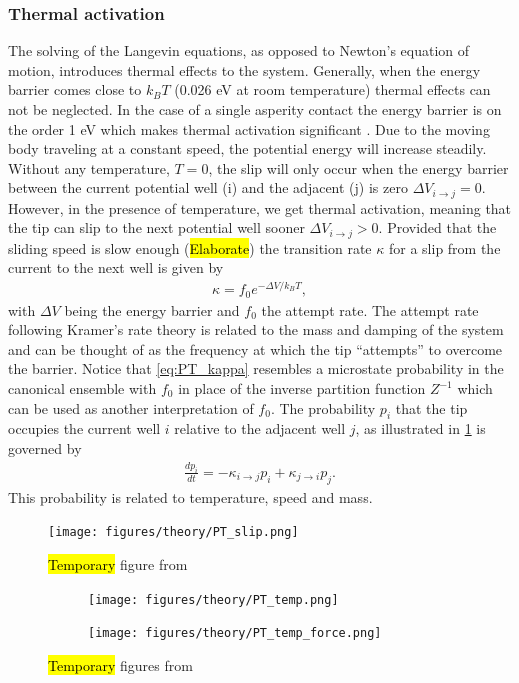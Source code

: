 \subsubsection{Thermal activation}
The solving of the Langevin equations, as opposed to Newton's equation of motion, introduces thermal effects to the system. Generally, when the energy barrier comes close to $k_B T$ (0.026 eV at room temperature) thermal effects can not be neglected. In the case of a single asperity contact the energy barrier is on the order 1 eV which makes thermal activation significant \cite{Yalin_2011}. Due to the moving body traveling at a constant speed, the potential energy will increase steadily. Without any temperature, $T = 0$, the slip will only occur when the energy barrier between the current potential well (i) and the adjacent (j) is zero $\Delta V_{i\to j} = 0$. However, in the presence of temperature, we get thermal activation, meaning that the tip can slip to the next potential well sooner $\Delta V_{i\to j} > 0$. Provided that the sliding speed is slow enough (\hl{Elaborate}) the transition rate $\kappa$ for a slip from the current to the next well is given by
\begin{align}
  \kappa = f_0 e^{-\Delta V / k_B T},
  \label{eq:PT_kappa}
\end{align}
with $\Delta V$ being the energy barrier and $f_0$ the attempt rate. The attempt rate following Kramer’s rate theory \cite{RevModPhys.62.251} is related to the mass and damping of the system and can be thought of as the frequency at which the tip ``attempts'' to overcome the barrier. Notice that \cref{eq:PT_kappa} resembles a microstate probability in the canonical ensemble with $f_0$ in place of the inverse partition function $Z^{-1}$ which can be used as another interpretation of $f_0$. The probability $p_i$ that the tip occupies the current well $i$ relative to the adjacent well $j$, as illustrated in \cref{fig:PT_slip} is governed by 
\begin{align*}
  \frac{dp_i}{dt} = -\kappa_{i\to j}p_i + \kappa_{j\to i}p_j.
\end{align*}
This probability is related to temperature, speed and mass.

\begin{figure}[H]
  \centering
  \texttt{[image: figures/theory/PT\_slip.png]}
  \caption{\hl{Temporary} figure from \cite{Yalin_2011}}
  \label{fig:PT_slip}
\end{figure}


\begin{figure}[H]
  \centering
  \begin{subfigure}[t]{0.49\textwidth}
      \centering
      \texttt{[image: figures/theory/PT\_temp.png]}
      \caption{}
      \label{fig:PT_temp_a}
  \end{subfigure}
  \hfill
  \begin{subfigure}[t]{0.49\textwidth}
      \centering
      \texttt{[image: figures/theory/PT\_temp\_force.png]}
      \caption{}
      \label{fig:PT_temp_b}
  \end{subfigure}
  \hfill
  \hfill
     \caption{\hl{Temporary} figures from \cite{Yalin_2011}}
     \label{fig:PT_temp}
\end{figure}


